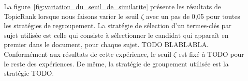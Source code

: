    La figure~\ref{fig:variation_du_seuil_de_similarite} présente les résultats
    de TopicRank lorsque nous faisons varier le seuil $\zeta$ avec un pas de
    0,05 pour toutes les stratégies de regroupement. La stratégie de sélection
    d'un termes-clés par sujet utilisée est celle qui consiste à sélectionner
    le candidat qui apparaît en premier dans le document, pour chaque sujet.
    TODO BLABLABLA. Conformément aux résultats de cette expérience, le seuil
    $\zeta$ est fixé à TODO pour le reste des expériences. De même, la stratégie
    de groupement utilisée est la stratégie TODO.
